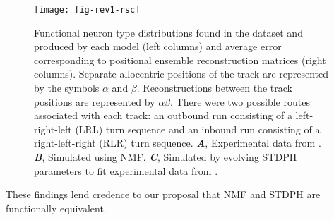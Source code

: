 \begin{figure}[ht]
	\centering
	\texttt{[image: fig-rev1-rsc]}
    \caption{Functional neuron type distributions found in the dataset 
         and produced by each model (left columns) 
         and average error corresponding to positional ensemble reconstruction
         matrices (right columns). 
         Separate allocentric positions of the track are represented 
         by the symbols $\alpha$ and $\beta$. 
         Reconstructions between the track positions are represented by
         $\alpha$$\beta$. 
         There were two possible routes associated with each track: 
         an outbound run consisting of a left-right-left (LRL) 
         turn sequence and an inbound run consisting of a 
         right-left-right (RLR) turn sequence.
      \textbf{\emph{A}},
         Experimental data from \cite{AlexanderNitz2015}.
      \textbf{\emph{B}},
         Simulated using NMF.
      \textbf{\emph{C}},
         Simulated by evolving STDPH parameters to fit experimental data
         from \cite{Rounds2016}.}
	\label{fig:NMF|RSC}
\end{figure} 



These findings lend credence to our proposal that \ac{NMF} and \ac{STDPH} 
are functionally equivalent.




